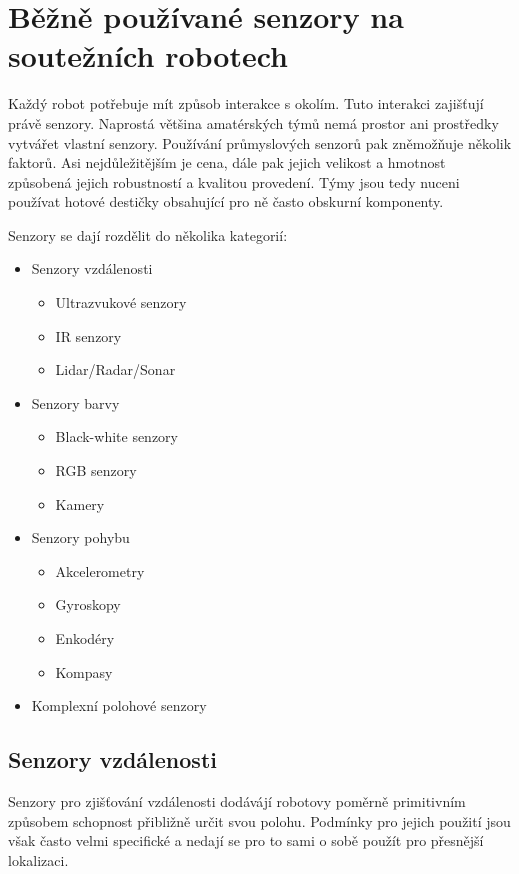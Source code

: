 \chapter{Běžně používané senzory na soutežních robotech}

Každý robot potřebuje mít způsob interakce s okolím.
Tuto interakci zajišťují právě senzory.
Naprostá většina amatérských týmů nemá prostor ani prostředky vytvářet vlastní senzory.
Používání průmyslových senzorů pak zněmožňuje několik faktorů.
Asi nejdůležitějším je cena, dále pak jejich velikost a hmotnost způsobená jejich robustností a kvalitou provedení.
Týmy jsou tedy nuceni používat hotové destičky obsahující pro ně často obskurní komponenty.

Senzory se dají rozdělit do několika kategorií:
\begin{itemize}
    \item Senzory vzdálenosti
        \begin{itemize}
            \item Ultrazvukové senzory
            \item IR senzory
            \item Lidar/Radar/Sonar
        \end{itemize}
    \item Senzory barvy
        \begin{itemize}
            \item Black-white senzory
            \item RGB senzory
            \item Kamery
        \end{itemize}
    \item Senzory pohybu
        \begin{itemize}
            \item Akcelerometry
            \item Gyroskopy
            \item Enkodéry
            \item Kompasy
        \end{itemize}
    \item Komplexní polohové senzory
\end{itemize}

\section{Senzory vzdálenosti}

Senzory pro zjišťování vzdálenosti dodávájí robotovy poměrně primitivním způsobem schopnost přibližně určit svou polohu.
Podmínky pro jejich použití jsou však často velmi specifické a nedají se pro to sami o sobě použít pro přesnější lokalizaci.

